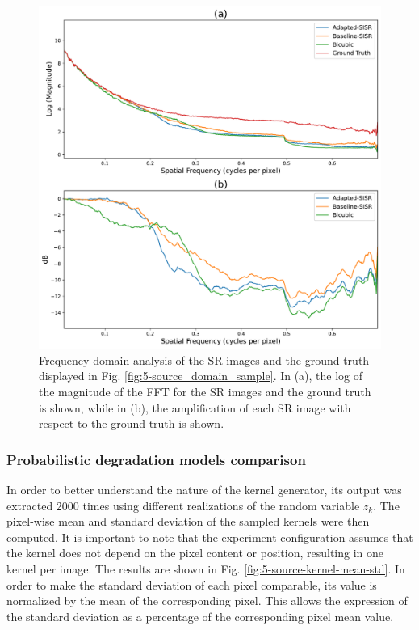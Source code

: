         \begin{figure}[H]
            \centering
            \includegraphics[scale=0.5]{Includes/5-source-sr-fft-comparison.pdf}
            \caption{Frequency domain analysis of the SR images and the ground truth displayed in Fig. \ref{fig:5-source_domain_sample}.
                     In (a), the log of the magnitude of the FFT for the SR images and the ground truth is shown,
                     while in (b), the amplification of each SR image with respect to the ground truth is shown.}
            \label{fig:5-source-sr-fft-comparison}
        \end{figure}

        \subsubsection{Probabilistic degradation models comparison}

        In order to better understand the nature of the kernel generator, its output was extracted 2000 times using different realizations of the random variable $z_k$.
        The pixel-wise mean and standard deviation of the sampled kernels were then computed.
        It is important to note that the experiment configuration assumes that the kernel does not depend on the pixel content or position, resulting in one kernel per image.
        The results are shown in Fig. \ref{fig:5-source-kernel-mean-std}. 
        In order to make the standard deviation of each pixel comparable, its value is normalized by the mean of the corresponding pixel. 
        This allows the expression of the standard deviation as a percentage of the corresponding pixel mean value.
        
